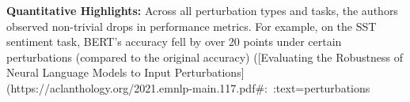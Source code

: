 \textbf{Quantitative Highlights:} Across all perturbation types and tasks, the authors observed non-trivial drops in performance metrics. For example, on the SST sentiment task, BERT’s accuracy fell by over 20 points under certain perturbations (compared to the original accuracy) ([Evaluating the Robustness of Neural Language Models to Input Perturbations](https://aclanthology.org/2021.emnlp-main.117.pdf#:~:text=perturbations%


